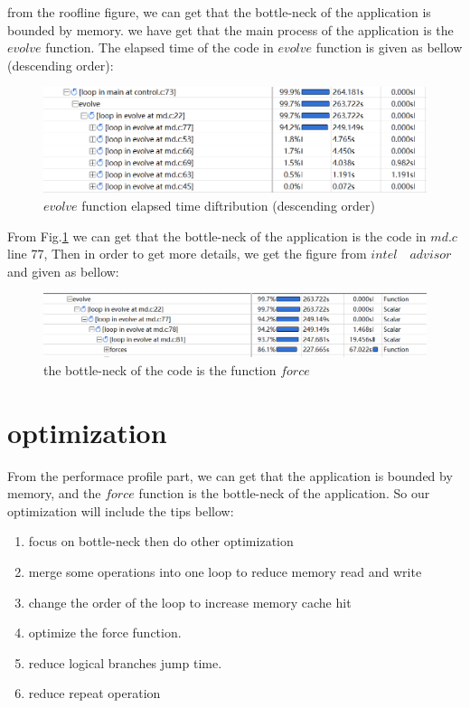 \documentclass{article}
\begin{document}
\noindent from the roofline figure, we can get that the bottle-neck
of the application is bounded by memory. we have get that the main
process of the application is the $evolve$ function. The elapsed
time of the code in $evolve$ function is given as bellow (descending
order):
\begin{figure}[H]
	\centering
	\includegraphics[width=0.7\linewidth]{time.jpg}
	\caption{$evolve$ function elapsed time diftribution (descending order)}
	\label{fig:time}
\end{figure}


\noindent From Fig.\ref{fig:time} we can get that the bottle-neck of the application is the code in $md.c$ line 77, Then in order to get more details, we get the figure from $intel\quad advisor$ and given as bellow:
\begin{figure}[H]
	\centering
	\includegraphics[width=0.7\linewidth]{force.jpg}
	\caption{the bottle-neck of the code is the function $force$}
	\label{fig:force}
\end{figure}
\section{optimization}
From the performace profile part, we can get that the application is bounded by memory, and the $force$ function is the bottle-neck of the application. So our optimization will include the tips bellow:
\begin{enumerate}
	\item focus on bottle-neck then do other optimization
	\item merge some operations into one loop to reduce memory read and write
	\item change the order of the loop to increase memory cache hit
	\item optimize the force function.
	\item reduce logical branches jump time.
	\item reduce repeat operation
\end{enumerate}
\end{document}

